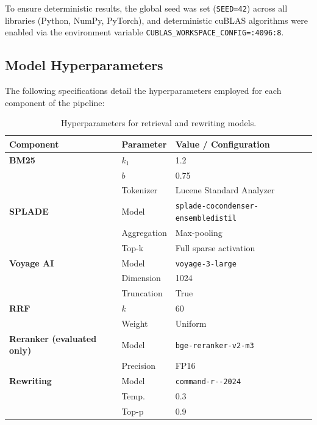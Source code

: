 \documentclass[11pt]{article}
\begin{document}
To ensure deterministic results, the global seed was set (\texttt{SEED=42}) across all libraries (Python, NumPy, PyTorch), and deterministic cuBLAS algorithms were enabled via the environment variable \texttt{CUBLAS\_WORKSPACE\_CONFIG=:4096:8}.

\subsection{Model Hyperparameters}

The following specifications detail the hyperparameters employed for each component of the pipeline:
\begin{table}[htbp]
\centering
\caption{Hyperparameters for retrieval and rewriting models.}
\label{tab:hyperparameters}
\footnotesize %
\setlength{\tabcolsep}{4pt} %
\begin{tabularx}{\columnwidth}{@{}l l X@{}}
\toprule
\textbf{Component} & \textbf{Parameter} & \textbf{Value / Configuration} \\
\midrule
\textbf{BM25} 
    & $k_1$ & 1.2 \\
    & $b$   & 0.75 \\
    & Tokenizer & Lucene Standard Analyzer \\
\midrule
\textbf{SPLADE}
    & Model & \texttt{splade-\allowbreak cocondenser-\allowbreak ensembledistil} \\
    & Aggregation & Max-pooling \\
    & Top-k & Full sparse activation \\
\midrule
\textbf{Voyage AI}
    & Model & \texttt{voyage-3-large} \\
    & Dimension & 1024 \\
    & Truncation & True \\
\midrule
\textbf{RRF}
    & $k$ & 60 \\
    & Weight & Uniform \\
\midrule
\textbf{Reranker (evaluated only)}
    & Model & \texttt{bge-\allowbreak reranker-\allowbreak v2-m3} \\
    & Precision & FP16 \\
\midrule
\textbf{Rewriting}
    & Model & \texttt{command-\allowbreak r-\allowbreak 08-2024} \\
    & Temp. & 0.3 \\
    & Top-p & 0.9 \\ %
\bottomrule
\end{tabularx}
\end{table}
\end{document}
